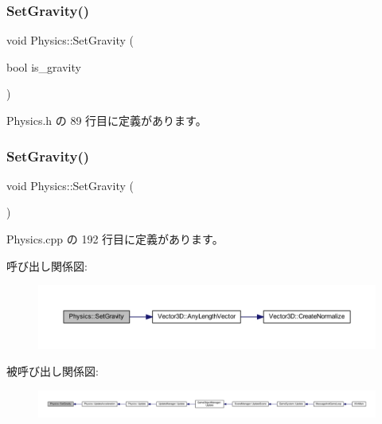 \subsubsection{\texorpdfstring{Set\+Gravity()}{SetGravity()}\hspace{0.1cm}{\footnotesize\ttfamily [1/2]}}
{\footnotesize\ttfamily void Physics\+::\+Set\+Gravity (\begin{DoxyParamCaption}\item[{bool}]{is\+\_\+gravity }\end{DoxyParamCaption})\hspace{0.3cm}{\ttfamily [inline]}}



 Physics.\+h の 89 行目に定義があります。

\mbox{\label{class_physics_ac52e3e0cccd6268aa592d1e5f098a685}} 
\subsubsection{\texorpdfstring{Set\+Gravity()}{SetGravity()}\hspace{0.1cm}{\footnotesize\ttfamily [2/2]}}
{\footnotesize\ttfamily void Physics\+::\+Set\+Gravity (\begin{DoxyParamCaption}{ }\end{DoxyParamCaption})\hspace{0.3cm}{\ttfamily [private]}}



 Physics.\+cpp の 192 行目に定義があります。

呼び出し関係図\+:\nopagebreak
\begin{figure}[H]
\begin{center}
\leavevmode
\includegraphics[width=350pt]{class_physics_ac52e3e0cccd6268aa592d1e5f098a685_cgraph}
\end{center}
\end{figure}
被呼び出し関係図\+:
\nopagebreak
\begin{figure}[H]
\begin{center}
\leavevmode
\includegraphics[width=350pt]{class_physics_ac52e3e0cccd6268aa592d1e5f098a685_icgraph}
\end{center}
\end{figure}
\mbox{\label{class_physics_a5bb34919242bdb3472e574b7e024b7e7}} 
